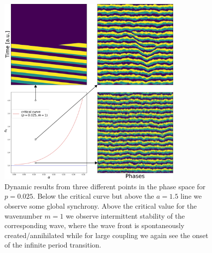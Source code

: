 \begin{figure}
  \centering
  \includegraphics[width=0.8\textwidth]{fig/chap4/crit_plane_sample2.png}
	\caption{
		Dynamic results from three different points in the phase space for $p=0.025$. Below the critical curve but above the $a=1.5$ line
		we observe some global synchrony. Above the critical value for the wavenumber $m=1$ we observe intermittent stability of the
		corresponding wave, where the wave front is spontaneously created/annihilated while for large coupling we again see the onset of
		the infinite period transition.
	}
	\label{fig:critical_plane_sample2}
\end{figure}

